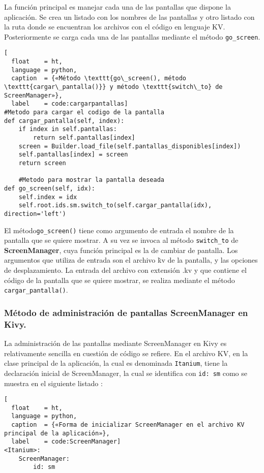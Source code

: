 La función principal es manejar cada una de las pantallas que dispone la aplicación. Se crea un listado con los nombres de las pantallas y otro listado con la ruta donde se encuentran los archivos con el código en lenguaje KV. Posteriormente se carga cada una de las pantallas mediante el método \texttt{go\_screen}.\\

\begin{lstlisting}[
  float    = ht,  
  language = python,
  caption  = {«Método \texttt{go\_screen(), método \texttt{cargar\_pantalla()}} y método \texttt{switch\_to} de ScreenManager»},
  label    = code:cargarpantallas]
#Metodo para cargar el codigo de la pantalla
def cargar_pantalla(self, index):
	if index in self.pantallas:
		return self.pantallas[index]
	screen = Builder.load_file(self.pantallas_disponibles[index])
	self.pantallas[index] = screen
	return screen

	#Metodo para mostrar la pantalla deseada
def go_screen(self, idx):
	self.index = idx
	self.root.ids.sm.switch_to(self.cargar_pantalla(idx), direction='left')
\end{lstlisting}

El método\texttt{go\_screen()} tiene como argumento de entrada el nombre de la pantalla que se quiere mostrar. A su vez se invoca al método \texttt{switch\_to} de \textbf{ScreenManager}, cuya función principal es la de cambiar de pantalla. Los argumentos que utiliza de entrada son el archivo \.kv de la pantalla, y las opciones de desplazamiento. La entrada del archivo con extensión .kv y que contiene el código de la pantalla que se quiere mostrar, se realiza mediante el método \texttt{cargar\_pantalla()}.

\subsubsection{Método de administración de pantallas ScreenManager en Kivy.}
La administración de las pantallas mediante ScreenManager en Kivy es relativamente sencilla en cuestión de código se refiere. En el archivo KV, en la clase principal de la aplicación, la cual es denominada \texttt{Itanium}, tiene la declaración inicial de ScreenManager, la cual se identifica con \texttt{id: sm} como se muestra en el siguiente listado \label{ScreenManager}:
\begin{lstlisting}[
  float    = ht,  
  language = python,
  caption  = {«Forma de inicializar ScreenManager en el archivo KV principal de la aplicación»},
  label    = code:ScreenManager]
<Itanium>:
    ScreenManager:
        id: sm
\end{lstlisting}

